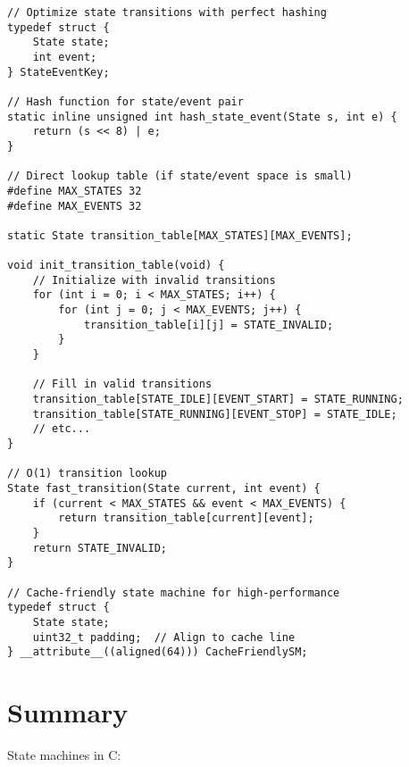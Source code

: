 \begin{lstlisting}
// Optimize state transitions with perfect hashing
typedef struct {
    State state;
    int event;
} StateEventKey;

// Hash function for state/event pair
static inline unsigned int hash_state_event(State s, int e) {
    return (s << 8) | e;
}

// Direct lookup table (if state/event space is small)
#define MAX_STATES 32
#define MAX_EVENTS 32

static State transition_table[MAX_STATES][MAX_EVENTS];

void init_transition_table(void) {
    // Initialize with invalid transitions
    for (int i = 0; i < MAX_STATES; i++) {
        for (int j = 0; j < MAX_EVENTS; j++) {
            transition_table[i][j] = STATE_INVALID;
        }
    }

    // Fill in valid transitions
    transition_table[STATE_IDLE][EVENT_START] = STATE_RUNNING;
    transition_table[STATE_RUNNING][EVENT_STOP] = STATE_IDLE;
    // etc...
}

// O(1) transition lookup
State fast_transition(State current, int event) {
    if (current < MAX_STATES && event < MAX_EVENTS) {
        return transition_table[current][event];
    }
    return STATE_INVALID;
}

// Cache-friendly state machine for high-performance
typedef struct {
    State state;
    uint32_t padding;  // Align to cache line
} __attribute__((aligned(64))) CacheFriendlySM;
\end{lstlisting}

\section{Summary}

State machines in C:

